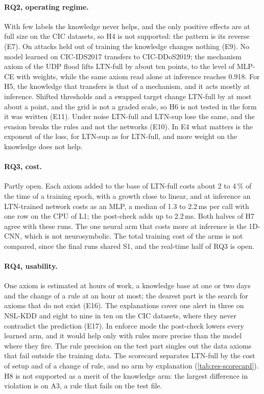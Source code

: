 \paragraph{RQ2, operating regime.}
With few labels the knowledge never helps, and the only positive effects are at full size on the CIC datasets, so H4 is
not supported: the pattern is its reverse (E7). On attacks held out of training the knowledge changes nothing (E9). No
model learned on CIC-IDS2017 transfers to CIC-DDoS2019; the mechanism axiom of the UDP flood lifts LTN-full by about ten
points, to the level of MLP-CE with weights, while the same axiom read alone at inference reaches 0.918. For H5, the
knowledge that transfers is that of a mechanism, and it acts mostly at inference. Shifted thresholds and a swapped target
change LTN-full by at most about a point, and the grid is not a graded scale, so H6 is not tested in the form it was written
(E11). Under noise LTN-full and LTN-sup lose the same, and the evasion breaks the rules and not the networks (E10). In E4
what matters is the exponent of the loss, for LTN-sup as for LTN-full, and more weight on the knowledge does not help.

\paragraph{RQ3, cost.}
Partly open. Each axiom added to the base of LTN-full costs about 2 to 4\,\% of the time of a training epoch, with a
growth close to linear, and at inference an LTN-trained network costs as an MLP, a median of 1.3 to 2.2\,ms per call with one row
on the CPU of L1; the post-check adds up to 2.2\,ms. Both halves of H7 agree with these runs. The one neural arm
that costs more at inference is the 1D-CNN, which is not neurosymbolic. The total training cost of the arms is not
compared, since the final runs shared S1, and the real-time half of RQ3 is open.

\paragraph{RQ4, usability.}
One axiom is estimated at hours of work, a knowledge base at one or two days and the change of a rule at an hour at most;
the dearest part is the search for axioms that do not exist (E16). The explanations cover one alert in three on NSL-KDD and
eight to nine in ten on the CIC datasets, where they never contradict the prediction (E17). In enforce mode the post-check
lowers every learned arm, and it would help only with rules more precise than the model where they fire. The rule
precision on the test part singles out the data axioms that fail outside the training data. The scorecard separates
LTN-full by the cost of setup and of a change of rule, and no arm by explanation (\cref{tab:res-scorecard}). H8 is not
supported as a merit of the knowledge arm: the largest difference in violation is on A3, a rule that fails on the
test file.

